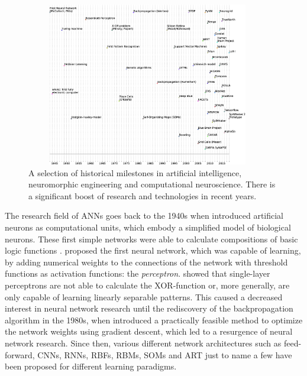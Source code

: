 \begin{figure}[t!]
	\centering
	\includegraphics[width=0.95\textwidth,height=270px]{imgs/neuromorphic_timeline.eps}
	\caption{A selection of historical milestones in artificial intelligence, neuromorphic engineering and computational neuroscience. There is a significant boost of research and technologies in recent years.}
	\label{fig:neuro_time}
\end{figure}
The research field of \acfp{ANN} goes back to the 1940s when \textcite{McCulloch1943} introduced artificial neurons as computational units, which embody a simplified model of biological neurons.
These first simple networks were able to calculate compositions of basic logic functions \parencite{McCulloch1943, Rojas1996}.
\textcite{Rosenblatt58} proposed the first neural network, which was capable of learning, by adding numerical weights to the connections of the network with threshold functions as activation functions: the \textit{perceptron}.
\textcite{Minsky1969} showed that single-layer perceptrons are not able to calculate the XOR-function or, more generally, are only capable of learning linearly separable patterns.
This caused a decreased interest in neural network research until the rediscovery of the backpropagation algorithm \parencite{Werbos1974} in the 1980s, when \textcite{Rumelhart1986} introduced a practically feasible method to optimize the network weights using gradient descent, which led to a resurgence of neural network research.
Since then, various different network architectures such as feed-forward, \acp{CNN}, \acp{RNN}, \acp{RBF}, \acp{RBM}, \acp{SOM} and \ac{ART} just to name a few \parencite{Schmidhuber2015} have been proposed for different learning paradigms.
